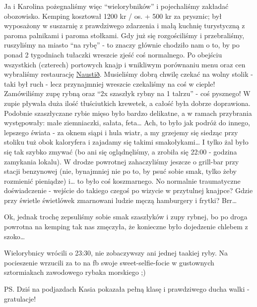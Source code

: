 
Ja i Karolina pożegnaliśmy więc “wielorybników” i pojechaliśmy zakładać obozowisko. Kemping kosztował 1200 kr / os. + 500 kr za prysznic; był wyposażony w suszarnię z prawdziwego zdarzenia i małą kuchnię turystyczną z paroma palnikami i paroma stołkami. Gdy już się rozgościliśmy i przebraliśmy, ruszyliśmy na miasto “na rybę” - to znaczy głównie chodziło nam o to, by po ponad 2 tygodniach tułaczki wreszcie zjeść coś normalnego. Po obejściu wszystkich (czterech) portowych knajp i wnikliwym porównaniu menu oraz cen wybraliśmy restaurację \href{https://www.facebook.com/naustid}{Naustið}. Musieliśmy dobrą chwilę czekać na wolny stolik - taki był ruch - lecz przynajmniej wreszcie czekaliśmy na coś w cieple! Zamówiliśmy zupę rybną oraz “2x szaszłyk rybny na 1 talrzu” - coś pysznego! W zupie pływała duża ilość tłuściutkich krewetek, a całość była dobrze doprawiona. Podobnie szaszłyczane rybie mięso było bardzo delikatne, a w ramach przybrania występowały: małe ziemniaczki, sałata, feta… Ach, to było jak podróż do innego, lepszego świata - za oknem siąpi i hula wiatr, a my grzejemy się siedząc przy stoliku tuż obok kaloryfera i zajadamy się takimi smakołykami… I tylko żal było się tak szybko zmywać (bo ani się oglądnęliśmy, a zrobiła się 22:00 - godzina zamykania lokalu). W drodze powrotnej zahaczyliśmy jeszcze o grill-bar przy stacji benzynowej (nie, bynajmniej nie po to, by psuć sobie smak, tylko żeby rozmienić pieniądze) i… to było coś koszmarnego. No normalnie traumatyczne doświadczenie - wejście do takiego czegoś po wizycie w przytulnej knajpce? Gdzie przy świetle świetlówek zmarnowani ludzie męczą hamburgery i frytki? Brr…

Ok, jednak trochę zepsuliśmy sobie smak szaszłyków i zupy rybnej, bo po droga powrotna na kemping tak nas zmęczyła, że konieczne było dojedzenie chlebem z szoko…

Wielorybnicy wrócili o 23:30, nie zobaczywszy ani jednej taakiej ryby. Na pocieszenie wrzucili za to na fb swoje sweet-selfie-focie w gustownych sztormiakach zawodowego rybaka morskiego ;)

PS. Dziś na podjazdach Kasia pokazała pełną klasę i prawdziwego ducha walki - gratulacje!
